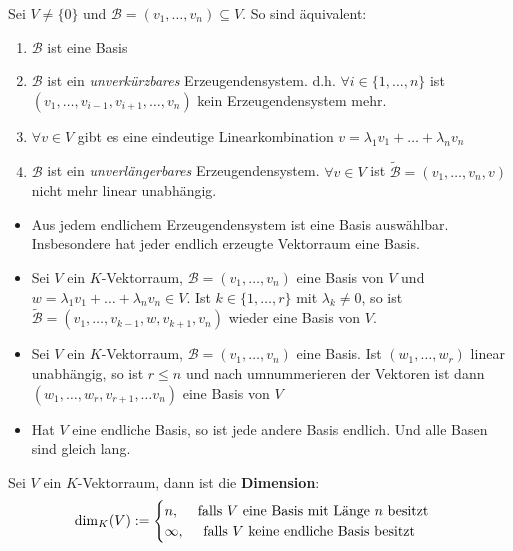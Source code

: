 Sei $V \neq \{0\}$ und $\mathcal{B} = (v_1, \ldots, v_n) \subseteq V$. So sind äquivalent:
\begin{enumerate}[{(}i{)}]
    \item $\mathcal{B}$ ist eine Basis
    
    \item $\mathcal{B}$ ist ein \emph{unverkürzbares} Erzeugendensystem. d.h. $\forall i \in \{1, \ldots, n\}$ ist $(v_1, \ldots, v_{i-1}, v_{i+1}, \ldots, v_n)$ kein Erzeugendensystem mehr.
    
    \item $\forall v \in V$ gibt es eine eindeutige Linearkombination $v = \lambda_{1} v_{1} + \ldots + \lambda_{n} v_{n}$
    
    \item $\mathcal{B}$ ist ein \emph{unverlängerbares} Erzeugendensystem. $\forall v \in V$ ist $\tilde{\mathcal{B}} = (v_1, \ldots, v_n,v)$ nicht mehr linear unabhängig.
\end{enumerate}
\begin{mdframed}
\begin{itemize}
    \item {} Aus jedem endlichem Erzeugendensystem ist eine Basis auswählbar. Insbesondere hat jeder endlich erzeugte Vektorraum eine Basis.
    
    \item {} Sei $V$ ein $K$-Vektorraum, $\mathcal{B} = (v_1, \ldots, v_n)$ eine Basis von $V$ und $w = \lambda_{1} v_{1} + \ldots + \lambda_{n} v_{n} \in V$. Ist $k \in \{1,\ldots,r\}$ mit $\lambda_k \neq 0$, so ist
    $\tilde{\mathcal{B}} = (v_1, \ldots, v_{k-1}, w, v_{k+1}, v_n)$ wieder eine Basis von $V$.
    
    \item {} Sei $V$ ein $K$-Vektorraum, $\mathcal{B} = (v_1, \ldots, v_n)$ eine Basis. Ist $(w_1, \ldots, w_r)$ linear unabhängig, so ist $r \leq n$ und nach umnummerieren der Vektoren ist dann
    $(w_1, \ldots, w_r, v_{r+1}, \ldots v_n)$ eine Basis von $V$
    
    \item Hat $V$ eine endliche Basis, so ist jede andere Basis endlich. Und alle Basen sind gleich lang.
\end{itemize}
\end{mdframed}
\begin{mdframed}
Sei $V$ ein $K$-Vektorraum, dann ist die \textbf{Dimension}:
\begin{align*}
    \dim_K(V) := \begin{cases}
        n, \text{ \quad falls $V$ eine Basis mit Länge $n$ besitzt}\\
        \infty, \quad \text{ falls $V$ keine endliche Basis besitzt}
    \end{cases}
\end{align*}
\end{mdframed}
